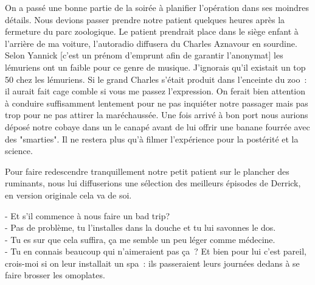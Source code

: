 On a passé une bonne partie de la soirée à planifier l’opération dans ses moindres détails. Nous devions passer prendre notre patient quelques heures après la fermeture du parc zoologique. Le patient prendrait place dans le siège enfant à l’arrière de ma voiture, l’autoradio diffusera du Charles Aznavour en sourdine. Selon Yannick [c’est un prénom d’emprunt afin de garantir l’anonymat] les lémuriens ont un faible pour ce genre de musique. J’ignorais qu’il existait un top 50 chez les lémuriens. Si le grand Charles s’était produit dans l’enceinte du zoo : il aurait fait cage comble si vous me passez l’expression. On ferait bien attention à conduire suffisamment lentement pour ne pas inquiéter notre passager mais pas trop pour ne pas attirer la maréchaussée. Une fois arrivé à bon port nous aurions déposé notre cobaye dans un le canapé avant de lui offrir une banane fourrée avec des "smarties". Il ne restera plus qu’à filmer l’expérience pour la postérité et la science.

Pour faire redescendre tranquillement notre petit patient sur le plancher des ruminants, nous lui diffuserions une sélection des meilleurs épisodes de Derrick, en version originale cela va de soi.

- Et s’il commence à nous faire un bad trip?\\
- Pas de problème, tu l’installes dans la douche et tu lui savonnes le dos.\\
- Tu es sur que cela suffira, ça me semble un peu léger comme médecine. \\
- Tu en connais beaucoup qui n’aimeraient pas ça ? Et bien pour lui c’est pareil, crois-moi si on leur installait un spa : ils passeraient leurs journées dedans à se faire brosser les omoplates.

